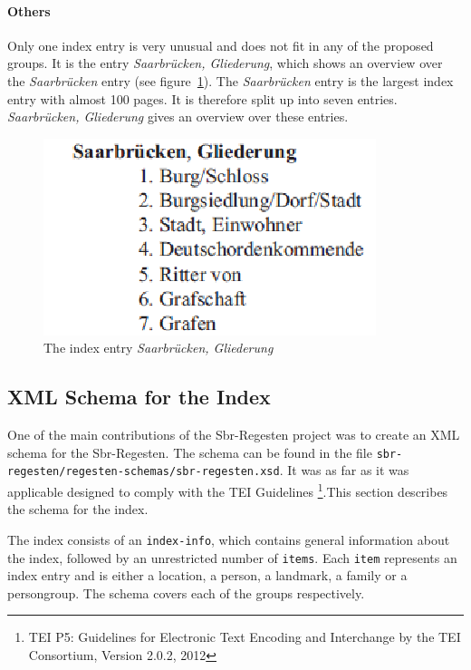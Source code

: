 \paragraph{Others}
\label{sec:other-index-entry}
Only one index entry is very unusual and does not fit in any of the proposed groups. It is the entry \textit{Saarbrücken, Gliederung}, which shows an overview over the \textit{Saarbrücken} entry (see figure~\ref{fig:sb-gliederung}). The \textit{Saarbrücken} entry is the largest index entry with almost 100 pages. It is therefore split up into seven entries. \textit{Saarbrücken, Gliederung} gives an overview over these entries.

\begin{figure}[h]
  \centering
  \includegraphics[scale=0.6]{img/sb-gliederung}
  \caption{The index entry \textit{Saarbrücken, Gliederung}}
  \label{fig:sb-gliederung}
\end{figure}


\subsection{XML Schema for the Index}
\label{sec:index-schema}
One of the main contributions of the Sbr-Regesten project was to create an XML schema for the Sbr-Regesten. The schema can be found in the file \texttt{sbr-regesten/regesten-schemas/sbr-regesten.xsd}.
It was as far as it was applicable designed to comply with the TEI Guidelines \footnote{TEI P5: Guidelines for Electronic Text Encoding and Interchange by the TEI Consortium, Version 2.0.2, 2012}.This section describes the schema for the index.

The index consists of an \texttt{index-info}, which contains general information about the index, followed by an unrestricted number of \texttt{items}. Each \texttt{item} represents an index entry and is either a location, a person, a landmark, a family or a persongroup. The schema covers each of the groups respectively.

